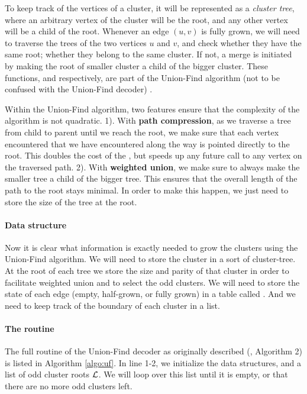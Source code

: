 To keep track of the vertices of a cluster, it will be represented as a \emph{cluster tree}, where an arbitrary vertex of the cluster will be the root, and any other vertex will be a child of the root. Whenever an edge $(u,v)$ is fully grown, we will need to traverse the trees of the two vertices $u$ and $v$, and check whether they have the same root; whether they belong to the same cluster. If not, a merge is initiated by making the root of smaller cluster a child of the bigger cluster. These functions,  and  respectively, are part of the Union-Find algorithm (not to be confused with the Union-Find decoder) \cite{tarjan1975efficiency}.



Within the Union-Find algorithm, two features ensure that the complexity of the algorithm is not quadratic. 1). With \textbf{path compression}, as we traverse a tree from child to parent until we reach the root, we make sure that each vertex encountered that we have encountered along the way is pointed directly to the root. This doubles the cost of the , but speeds up any future call to any vertex on the traversed path. 2). With \textbf{weighted union}, we make sure to always make the smaller tree a child of the bigger tree. This ensures that the overall length of the path to the root stays minimal. In order to make this happen, we just need to store the size of the tree at the root.

\paragraph{Data structure}
Now it is clear what information is exactly needed to grow the clusters using the Union-Find algorithm. We will need to store the cluster in a sort of cluster-tree. At the root of each tree we store the size and parity of that cluster in order to facilitate weighted union and to select the odd clusters. We will need to store the state of each edge (empty, half-grown, or fully grown) in a table called . And we need to keep track of the boundary of each cluster in a  list.

\paragraph{The routine}
The full routine of the Union-Find decoder as originally described (\cite{delfosse2017almost}, Algorithm 2) is listed in Algorithm \ref{algo:uf}. In line 1-2, we initialize the data structures, and a list of odd cluster roots $\mathcal{L}$. We will loop over this list until it is empty, or that there are no more odd clusters left.

